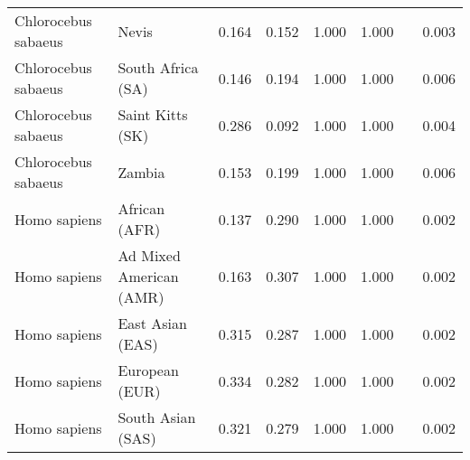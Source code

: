 \begin{center}
\begin{adjustbox}{width = 1\textwidth}
\begin{tabular}{|l|l|r|r|r|r|r|}
 Chlorocebus sabaeus &                           Nevis &                                              0.164 &                                              0.152 &                1.000 &                                  1.000~~ &              0.003 \\
 Chlorocebus sabaeus &               South Africa (SA) &                                              0.146 &                                              0.194 &                1.000 &                                  1.000~~ &              0.006 \\
 Chlorocebus sabaeus &                Saint Kitts (SK) &                                              0.286 &                                              0.092 &                1.000 &                                  1.000~~ &              0.004 \\
 Chlorocebus sabaeus &                          Zambia &                                              0.153 &                                              0.199 &                1.000 &                                  1.000~~ &              0.006 \\
        Homo sapiens &                   African (AFR) &                                              0.137 &                                              0.290 &                1.000 &                                  1.000~~ &              0.002 \\
        Homo sapiens &         Ad Mixed American (AMR) &                                              0.163 &                                              0.307 &                1.000 &                                  1.000~~ &              0.002 \\
        Homo sapiens &                East Asian (EAS) &                                              0.315 &                                              0.287 &                1.000 &                                  1.000~~ &              0.002 \\
        Homo sapiens &                  European (EUR) &                                              0.334 &                                              0.282 &                1.000 &                                  1.000~~ &              0.002 \\
        Homo sapiens &               South Asian (SAS) &                                              0.321 &                                              0.279 &                1.000 &                                  1.000~~ &              0.002 \\
\bottomrule
\end{tabular}
\end{adjustbox}
\newpage
\end{center}

